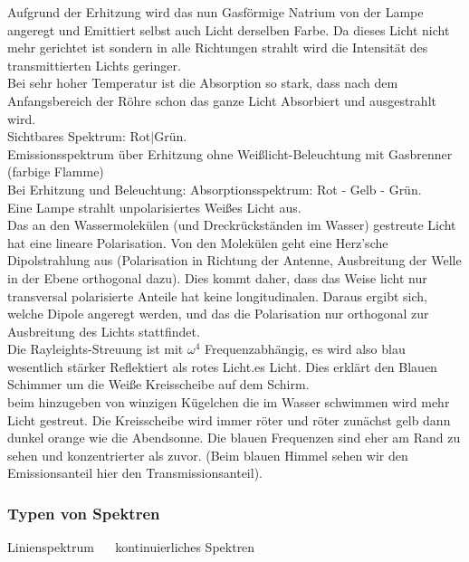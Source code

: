 Aufgrund der Erhitzung wird das nun Gasförmige Natrium von der Lampe angeregt und Emittiert selbst auch Licht derselben Farbe. Da dieses Licht nicht mehr gerichtet ist sondern in alle Richtungen strahlt wird die Intensität des transmittierten Lichts geringer.\\
Bei sehr hoher Temperatur ist die Absorption so stark, dass nach dem Anfangsbereich der Röhre schon das ganze Licht Absorbiert und ausgestrahlt wird.\\[5pt]
Sichtbares Spektrum: Rot$ | $Grün.\\
Emissionsspektrum über Erhitzung ohne Weißlicht-Beleuchtung mit Gasbrenner (farbige Flamme)\\
Bei Erhitzung und Beleuchtung: Absorptionsspektrum: Rot - Gelb - Grün.\\[5pt]
Eine Lampe strahlt unpolarisiertes Weißes Licht aus.\\
Das an den Wassermolekülen (und Dreckrückständen im Wasser) gestreute Licht hat eine lineare Polarisation. Von den Molekülen geht eine Herz'sche Dipolstrahlung aus (Polarisation in Richtung der Antenne, Ausbreitung der Welle in der Ebene orthogonal dazu). Dies kommt daher, dass das Weise licht nur transversal polarisierte Anteile hat keine longitudinalen. Daraus ergibt sich, welche Dipole angeregt werden, und das die Polarisation nur orthogonal zur Ausbreitung des Lichts stattfindet.\\
Die Rayleights-Streuung ist mit $ \omega^4 $ Frequenzabhängig, es wird also blau wesentlich stärker Reflektiert als rotes Licht.es Licht. Dies erklärt den Blauen Schimmer um die Weiße Kreisscheibe auf dem Schirm.\\
beim hinzugeben von winzigen Kügelchen die im Wasser schwimmen wird mehr Licht gestreut. Die Kreisscheibe wird immer röter und röter zunächst gelb dann dunkel orange wie die Abendsonne. Die blauen Frequenzen sind eher am Rand zu sehen und konzentrierter als zuvor. (Beim blauen Himmel sehen wir den Emissionsanteil hier den Transmissionsanteil).\\[5pt]

\subsubsection{Typen von Spektren}

Linienspektrum $ \quad $ kontinuierliches Spektren\\

